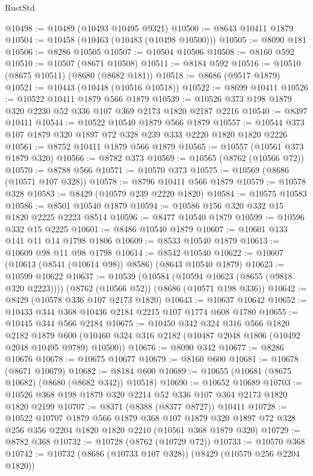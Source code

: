 \begin{lexlean}{RustStd}
\begin{coremodule}
@10498 := @10489 (@10493 @10495 @9321)
@10500 := @8643 @10411 @1879
@10504 := @10458 (@10463 (@10483 (@10498 @10500)))
@10505 := @8090 @181
@10506 := @8286 @10505
@10507 := @10504 @10506
@10508 := @8160 @592
@10510 := @10507 (@8671 @10508)
@10511 := @8184 @592
@10516 := @10510 (@8675 @10511) (@8680 (@8682 @181))
@10518 := @8686 (@9517 @1879)
@10521 := @10443 (@10448 (@10516 @10518))
@10522 := @8699 @10411
@10526 := @10522 @10411 @1879 @566 @1879
@10539 := @10526 @373 @198 @1879 @320 @2230 @52 @336 @107 @369 @2173 @1820 @2187 @2216
@10540 := @8397 @10411
@10544 := @10522 @10540 @1879 @566 @1879
@10557 := @10544 @373 @107 @1879 @320 @1897 @72 @328 @239 @333 @2220 @1820 @1820 @2226
@10561 := @8752 @10411 @1879 @566 @1879
@10565 := @10557 (@10561 @373 @1879 @320)
@10566 := @8782 @373
@10569 := @10565 (@8762 (@10566 @72))
@10570 := @8788 @566
@10571 := @10570 @373
@10575 := @10569 (@8686 (@10571 @107 @328))
@10578 := @8796 @10411 @566 @1879
@10579 := @10578 @328
@10583 := @8429 (@10579 @239 @2220 @1820)
@10584 := @10575 @10583
@10586 := @8501 @10540 @1879
@10594 := @10586 @156 @320 @332 @15 @1820 @2225 @2223 @8514
@10596 := @8477 @10540 @1879
@10599 := @10596 @332 @15 @2225
@10601 := @8486 @10540 @1879
@10607 := @10601 @133 @141 @11 @14 @1798 @1806
@10609 := @8533 @10540 @1879
@10613 := @10609 @98 @11 @98 @1798
@10614 := @8542 @10540
@10622 := @10607 (@10613 (@8541 (@10614 @98)) @8586) (@8643 @10540 @1879)
@10623 := @10599 @10622
@10637 := @10539
    (@10584 (@10594 @10623 (@8655 (@9818 @320 @2223))))
    (@8762 (@10566 @52))
    (@8686 (@10571 @198 @336))
@10642 := @8429 (@10578 @336 @107 @2173 @1820)
@10643 := @10637 @10642
@10652 := @10433 @344 @368 @10436 @2184 @2215 @107 @1774 @608 @1780
@10655 := @10445 @344 @566 @2184
@10675 := @10450
    @342
    @324
    @316
    @566
    @1820
    @2182
    @1879
    @600
    (@10460 @324 @316 @2182 (@10487 @2048 @1806 (@10492 @2048 @10495 @9789) @10500))
@10676 := @8090 @342
@10677 := @8286 @10676
@10678 := @10675 @10677
@10679 := @8160 @600
@10681 := @10678 (@8671 @10679)
@10682 := @8184 @600
@10689 := @10655 (@10681 (@8675 @10682) (@8680 (@8682 @342)) @10518)
@10690 := @10652 @10689
@10703 := @10526 @368 @198 @1879 @320 @2214 @52 @336 @107 @364 @2173 @1820 @1820 @2199
@10707 := @8371 (@8388 (@8377 @8727)) @10411
@10728 := @10522
    @10707
    @1879
    @566
    @1879
    @368
    @107
    @1879
    @320
    @1897
    @72
    @328
    @256
    @356
    @2204
    @1820
    @1820
    @2210
    (@10561 @368 @1879 @320)
@10729 := @8782 @368
@10732 := @10728 (@8762 (@10729 @72))
@10733 := @10570 @368
@10742 := @10732 (@8686 (@10733 @107 @328)) (@8429 (@10579 @256 @2204 @1820))

\end{coremodule}
\end{lexlean}
